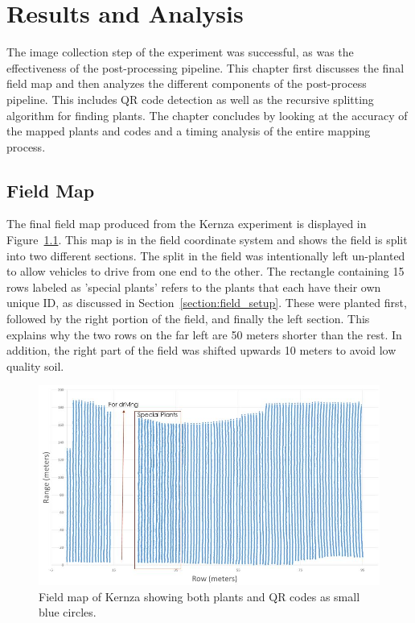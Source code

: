 
\cleardoublepage

\chapter{Results and Analysis}
\label{chapter:results}

The image collection step of the experiment was successful, as was the effectiveness of the post-processing pipeline.  This chapter first discusses the final field map and then analyzes the different components of the post-process pipeline.  This includes QR code detection as well as the recursive splitting algorithm for finding plants.  The chapter concludes by looking at the accuracy of the mapped plants and codes and a timing analysis of the entire mapping process.

\section{Field Map}

The final field map produced from the Kernza experiment is displayed in Figure~\ref{figure:field_map}.  This map is in the field coordinate system and shows the field is split into two different sections.  The split in the field was intentionally left un-planted to allow vehicles to drive from one end to the other.   The rectangle containing 15 rows labeled as 'special plants' refers to the plants that each have their own unique ID, as discussed in Section~\ref{section:field_setup}.  These were planted first, followed by the right portion of the field, and finally the left section.  This explains why the two rows on the far left are 50 meters shorter than the rest. In addition, the right part of the field was shifted upwards 10 meters to avoid low quality soil.

\begin{figure}
	\centering
    \includegraphics[width=6in]{figures/field_map.jpg}
    \caption[Field map]{Field map of Kernza showing both plants and QR codes as small blue circles.}
    \label{figure:field_map}
\end{figure}

